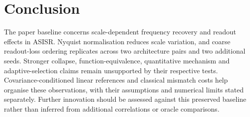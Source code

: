 \section{Conclusion}
The paper baseline concerns scale-dependent frequency recovery and readout effects in ASISR. Nyquist normalisation reduces scale variation, and coarse readout-loss ordering replicates across two architecture pairs and two additional seeds. Stronger collapse, function-equivalence, quantitative mechanism and adaptive-selection claims remain unsupported by their respective tests. Covariance-conditioned linear references and classical mismatch costs help organise these observations, with their assumptions and numerical limits stated separately. Further innovation should be assessed against this preserved baseline rather than inferred from additional correlations or oracle comparisons.
